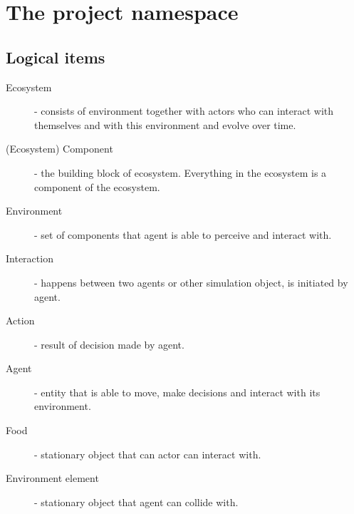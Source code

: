 \chapter{The project namespace}

\section{Logical items}
\begin{description}
    \item[Ecosystem] - consists of environment together with actors who can interact with themselves and with this environment and evolve over time.
    \item[(Ecosystem) Component] - the building block of ecosystem. Everything in the ecosystem is a component of the ecosystem.
    \item[Environment] - set of components that agent is able to perceive and interact with.
    \item[Interaction] - happens between two agents or other simulation object, is initiated by agent.
    \item[Action] - result of decision made by agent.
    \item[Agent] - entity that is able to move, make decisions and interact with its environment.
    \item[Food] - stationary object that can actor can interact with.
    \item[Environment element] - stationary object that agent can collide with.
\end{description}

